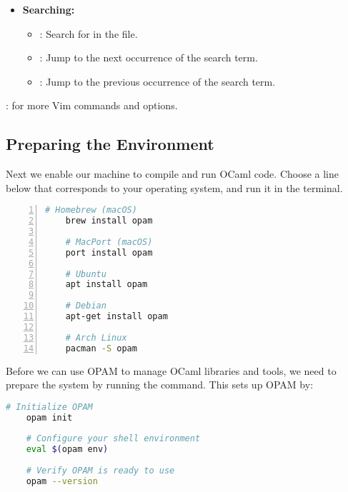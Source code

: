 \begin{Def}
\begin{itemize}
    \item \textbf{Searching:}
        \begin{itemize}
            \item {}: Search for  in the file.
            \item {}: Jump to the next occurrence of the search term.
            \item {}: Jump to the previous occurrence of the search term.
        \end{itemize}
\end{itemize}

\vspace{1em}
: for more Vim commands and options.
\end{Def}






\newpage


\vspace{-1em}
\subsection{Preparing the Environment}
\noindent
Next we enable our machine to compile and run OCaml code. Choose a line below that
corresponds to your operating system, and run it in the terminal.
\begin{lstlisting}[language=Bash, caption={Installing OPAM on Various Systems}, numbers=left]
    # Homebrew (macOS)
    brew install opam
    
    # MacPort (macOS)
    port install opam
    
    # Ubuntu
    apt install opam
    
    # Debian
    apt-get install opam
    
    # Arch Linux
    pacman -S opam
\end{lstlisting}

\noindent
Before we can use OPAM to manage OCaml libraries and tools, we need to prepare the system by running the  command. This sets up OPAM by:

\begin{lstlisting}[language=Bash, caption={Initializing OPAM}]
    # Initialize OPAM
    opam init
    
    # Configure your shell environment
    eval $(opam env)
    
    # Verify OPAM is ready to use
    opam --version
\end{lstlisting}


